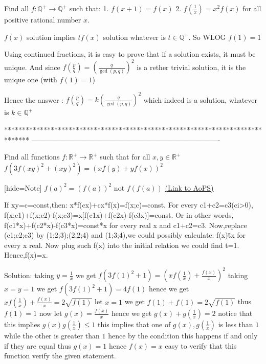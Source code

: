 \begin{solution}
	\begin{tcolorbox}Find all $f:\mathbb{Q}^+\rightarrow \mathbb{Q}^+$ such that:
1. $f(x+1)=f(x)$
2. $f(\frac{1}{x})=x^2f(x)$
for all positive rational number $x$.\end{tcolorbox}
$f(x)$ solution implies $tf(x)$ solution whatever is $t\in\mathbb Q^+$. So WLOG $f(1)=1$

Using continued fractions, it is easy to prove that if a solution exists, it must be unique.
And since $f(\frac pq)=\left(\frac q{\gcd(p,q)}\right)^2$ is a rether trivial solution, it is the unique one (with $f(1)=1$)

Hence the answer : $\boxed{f(\frac pq)=k\left(\frac q{\gcd(p,q)}\right)^2}$ which indeed is a solution, whatever is $k\in\mathbb Q^+$


\end{solution}
*******************************************************************************
-------------------------------------------------------------------------------

\begin{problem}
	Find all functions $f:\mathbb {R^{+}}\to\mathbb {R^{+}} $ such that for all $x,y\in \mathbb {R^{+}} $
$f (3f (xy)^2+(xy)^2)=(xf (y)+yf (x))^2$

[hide=Note] $f (a)^2=(f (a))^2$ not $f (f (a)) $
	\flushright \href{https://artofproblemsolving.com/community/c6h1610002}{(Link to AoPS)}
\end{problem}



\begin{solution}
	If xy=c=const,then:
x*f(c\/x)+c\/x*f(x)=f(x;c)=const.
For every c1+c2=c3(ci>0),
f(x;c1)+f(x;c2)-f(x;c3)=x[f(c1\/x)+f(c2\/x)-f(c3\/x)]=const.
Or in other words,
f(c1*x)+f(c2*x)-f(c3*x)=const*x for every real x and c1+c2=c3.
Now,replace (c1;c2;c3) by (1;2;3);(2;2;4) and (1;3;4),we could possibly calculate:
f(x)\=tx for every x real.
Now plug such f(x) into the initial relation we could find t=1.
Hence,f(x)=x.
\end{solution}



\begin{solution}
	Solution:
taking $y=\frac{1}{x}$ we get  $f(3f(1)^2+1)=(xf(\frac{1}{x})+\frac{f(x)}{x})^2$
taking $x=y=1$ we get $f(3f(1)^2+1)=4f(1)$ hence we get $xf(\frac{1}{x})+\frac{f(x)}{x}=2\sqrt{f(1)}$
let $x=1$ we get $f(1)+f(1)=2\sqrt{f(1)}$ thus $f(1)=1$
now let $g(x)=\frac{f(x)}{x}$
 hence we get $g(x)+g(\frac{1}{x})=2$ 
notice that this implies $g(x)g(\frac{1}{x}) \leq 1$
this implies that one of $g(x),g(\frac{1}{x})$ is less than $1$ while the other is greater than $1$
hence by the condition this happens if and only if they are equal thus $g(x)=1$  hence $f(x)=x$ 
easy to verify that this function verify the given statement.
\end{solution}



